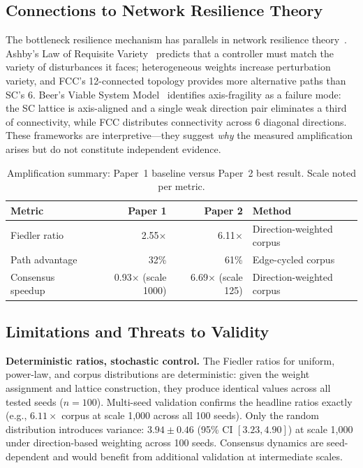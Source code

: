 \documentclass[11pt]{article}
\begin{document}
\subsection{Connections to Network Resilience Theory}
\label{sec:resilience}

The bottleneck resilience mechanism has parallels in network
resilience theory~\cite{dorogovtsev2008}. Ashby's Law of Requisite
Variety~\cite{ashby1956} predicts that a controller must match the
variety of disturbances it faces; heterogeneous weights increase
perturbation variety, and FCC's 12-connected topology provides more
alternative paths than SC's 6. Beer's Viable System
Model~\cite{beer1972} identifies axis-fragility as a failure mode:
the SC lattice is axis-aligned and a single weak direction pair
eliminates a third of connectivity, while FCC distributes
connectivity across 6 diagonal directions. These frameworks are
interpretive---they suggest \emph{why} the measured amplification
arises but do not constitute independent evidence.

\begin{table}[H]
\centering
\caption{Amplification summary: Paper~1 baseline versus Paper~2
  best result. Scale noted per metric.}
\label{tab:summary}
\begin{tabular}{lrrl}
\toprule
Metric & Paper 1 & Paper 2 & Method \\
\midrule
Fiedler ratio      & 2.55$\times$ & 6.11$\times$ & Direction-weighted corpus \\
Path advantage     & 32\%         & 61\%         & Edge-cycled corpus \\
Consensus speedup  & 0.93$\times$ (scale 1000) & 6.69$\times$ (scale 125) & Direction-weighted corpus \\
\bottomrule
\end{tabular}
\end{table}

\subsection{Limitations and Threats to Validity}

\textbf{Deterministic ratios, stochastic control.} The Fiedler
ratios for uniform, power-law, and corpus distributions are
deterministic: given the weight assignment and lattice construction,
they produce identical values across all tested seeds ($n = 100$).
Multi-seed validation confirms the headline ratios exactly
(e.g., $6.11\times$ corpus at scale 1{,}000 across all 100 seeds).
Only the random distribution introduces variance:
$3.94 \pm 0.46$ (95\% CI $[3.23, 4.90]$) at scale 1{,}000 under
direction-based weighting across 100 seeds. Consensus dynamics are
seed-dependent and would benefit from additional validation at
intermediate scales.
\end{document}
